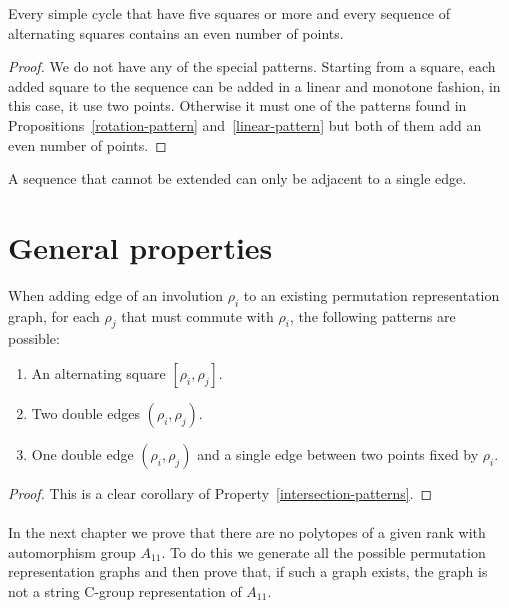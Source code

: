 \begin{corollary}
  \label{even-sequence}
  Every simple cycle that have five squares or more and every sequence of alternating squares contains an even number of points.
\end{corollary}

\begin{proof}
  We do not have any of the special patterns. Starting from a square, each added square to the sequence can be added in a linear and monotone fashion, in this case, it use two points. Otherwise it must one of the patterns found in Propositions~\ref{rotation-pattern} and~\ref{linear-pattern} but both of them add an even number of points.
\end{proof}

\begin{proposition}
  \label{sequence-connection}
  A sequence that cannot be extended can only be adjacent to a single edge.
\end{proposition}

\section{General properties}

\begin{proposition}
  \label{patterns-adding}
  When adding edge of an involution $\rho_i$ to an existing permutation representation graph, for each $\rho_j$ that must commute with $\rho_i$, the following patterns are possible:
  \begin{enumerate}
    \item An alternating square $[\rho_i, \rho_j]$.
    \item Two double edges $(\rho_i, \rho_j)$.
    \item One double edge $(\rho_i, \rho_j)$ and a single edge between two points fixed by $\rho_i$.
  \end{enumerate}
\end{proposition}

\begin{proof}
  This is a clear corollary of Property~\ref{intersection-patterns}.
\end{proof}

\paragraph{}
In the next chapter we prove that there are no polytopes of a given rank with automorphism group $A_{11}$. To do this we generate all the possible permutation representation graphs and then prove that, if such a graph exists, the graph is not a string C-group representation of $A_{11}$.

